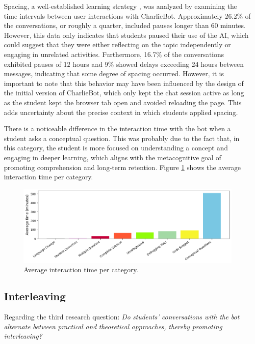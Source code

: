 \documentclass[a4paper,twoside]{article}
\begin{document}
Spacing, a well-established learning strategy \citep{Carvalho20}, was analyzed
by examining the time intervals between user interactions with CharlieBot.
Approximately 26.2\% of the conversations, or roughly a quarter, included pauses
longer than 60 minutes. However, this data only indicates that students paused
their use of the AI, which could suggest that they were either reflecting on the
topic independently or engaging in unrelated activities. Furthermore, 16.7\%
of the conversations exhibited pauses of 12 hours and 9\% showed delays
exceeding 24 hours between messages, indicating that some degree of spacing
occurred. However, it is important to note that this behavior may have been
influenced by the design of the initial version of CharlieBot, which only kept
the chat session active as long as the student kept the browser tab open and
avoided reloading the page. This adds uncertainty about the precise context in
which students applied spacing.

There is a noticeable difference in the interaction time with the bot when a
student asks a conceptual question. This was probably due to the fact that, in
this category, the student is more focused on understanding a concept and
engaging in deeper learning, which aligns with the metacognitive goal of
promoting comprehension and long-term retention. Figure \ref{fig:graph3}
shows the average interaction time per category.

\begin{figure}[htbp]
  \centering
  \includegraphics[scale=0.55]{img/figure3.png}
  \caption{Average interaction time per category.}
  \label{fig:graph3}
\end{figure}

\subsection{Interleaving}


Regarding the third research question: \textit{Do students' conversations with
the bot alternate between practical and theoretical approaches, thereby
promoting interleaving?}
\end{document}
